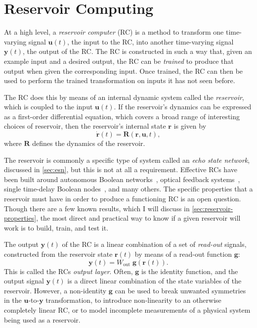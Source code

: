 \chapter{Reservoir Computing}\label{ch:reservoir-computing}

At a high level, a \emph{reservoir computer} (RC) is a method to
transform one time-varying signal $\bm{u}(t)$, the input to the RC,
into another time-varying signal $\bm{y}(t)$, the output of the
RC. The RC is constructed in such a way that, given an example input
and a desired output, the RC can be \emph{trained} to produce that
output when given the corresponding input. Once trained, the RC can
then be used to perform the trained transformation on inputs it has
not seen before.

The RC does this by means of an internal dynamic system called the
\emph{reservoir}, which is coupled to the input $\bm{u}(t)$. If the
reservoir's dynamics can be expressed as a first-order differential
equation, which covers a broad range of interesting choices of
reservoir, then the reservoir's internal state $\bm{r}$ is given by
\begin{equation}
  \label{eq:reservoir}
  \dot{\mathbf{r}}(t) = \mathbf{R}\left(\mathbf{r}, \mathbf{u}, t\right),
\end{equation}
where $\mathbf{R}$ defines the dynamics of the reservoir.

The reservoir is commonly a specific type of system called an
\emph{echo state network}, discussed in \cref{sec:esn}, but this is
not at all a requirement. Effective RCs have been built around
autonomous Boolean networks~\cite{canaday2018}, optical feedback
systems~\cite{antonik2016}, single time-delay Boolean
nodes~\cite{haynes2015}, and many others. The specific properties that
a reservoir must have in order to produce a functioning RC is an open
question. Though there are a few known results, which I will discuss
in \cref{sec:reservoir-properties}, the most direct and practical way
to know if a given reservoir will work is to build, train, and test
it.

The output $\bm{y}(t)$ of the RC is a linear
combination of a set of \emph{read-out} signals, constructed from the
reservoir state $\bm{r}(t)$ by means of a read-out function $\bm{g}$:
\begin{equation}
  \label{eq:output}
  \bm{y}(t) = W_\text{out}\;\bm{g}\left(\bm{r}(t)\right).
\end{equation}
This is called the RCs \emph{output layer}. Often, $\bm{g}$ is the
identity function, and the output signal $\bm{y}(t)$ is a direct
linear combination of the state variables of the reservoir. However, a
non-identity $\bm{g}$ can be used to break unwanted symmetries in the
$\bm{u}$-to-$\bm{y}$ transformation, to introduce non-linearity to an
otherwise completely linear RC, or to model incomplete measurements of
a physical system being used as a reservoir.

